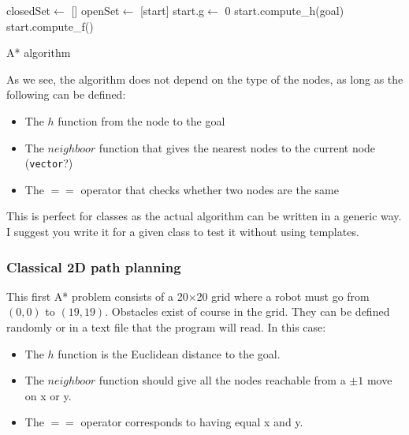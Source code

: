 \documentclass{ecnreport}
\begin{document}
\begin{algorithm}[!t]
{}
closedSet$\gets$ []\;
openSet$\gets$ [start]\;
start.g$\gets$ 0\;
start.compute\_h(goal)\;
start.compute\_f()\;
\caption{A* algorithm}
\label{algo:smallpoly}
\end{algorithm}

As we see, the algorithm does not depend on the type of the nodes, as long as the following can be defined:
\begin{itemize}
 \item The $h$ function from the node to the goal
 \item The $neighboor$ function that gives the nearest nodes to the current node (\texttt{vector}?)
 \item The $==$ operator that checks whether two nodes are the same
\end{itemize}

This is perfect for classes as the actual algorithm can be written in a generic way. I suggest you write it for a given class to test it without using templates.


\subsubsection{Classical 2D path planning}

This first A* problem consists of a 20$\times$20 grid where a robot must go from $(0,0)$ to $(19,19)$.
Obstacles exist of course in the grid. They can be defined randomly or in a text file that the program will read.
In this case:
\begin{itemize}
 \item The $h$ function is the Euclidean distance to the goal.
 \item The $neighboor$ function should give all the nodes reachable from a $\pm1$ move on x or y.
 \item The $==$ operator corresponds to having equal x and y.
\end{itemize}
\end{document}
